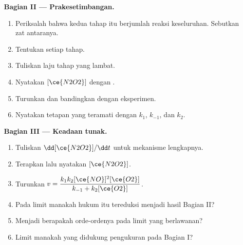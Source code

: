 \begin{problem}
\medskip
\noindent\textbf{Bagian II --- Prakesetimbangan.}
\begin{enumerate}[resume]
  \item Periksalah bahwa kedua tahap itu berjumlah reaksi keseluruhan.
        Sebutkan zat antaranya.
  \item Tentukan  setiap tahap.
  \item Tuliskan laju tahap yang lambat.
  \item Nyatakan $[\ce{N2O2}]$ dengan .
  \item Turunkan  dan bandingkan dengan eksperimen.
  \item Nyatakan tetapan yang teramati dengan $k_1$, $k_{-1}$, dan $k_2$.
\end{enumerate}

\medskip
\noindent\textbf{Bagian III --- Keadaan tunak.}
\begin{enumerate}[resume]
  \item Tuliskan $\dd[\ce{N2O2}]/\dd t$ untuk mekanisme lengkapnya.
  \item Terapkan  lalu nyatakan $[\ce{N2O2}]$.
  \item Turunkan  $v = \dfrac{k_1k_2[\ce{NO}]^2[\ce{O2}]}{k_{-1} +
        k_2[\ce{O2}]}$.
  \item Pada limit manakah hukum itu tereduksi menjadi hasil Bagian II?
  \item Menjadi berapakah orde-ordenya pada limit yang berlawanan?
  \item Limit manakah yang didukung pengukuran pada Bagian I?
\end{enumerate}


\end{problem}
